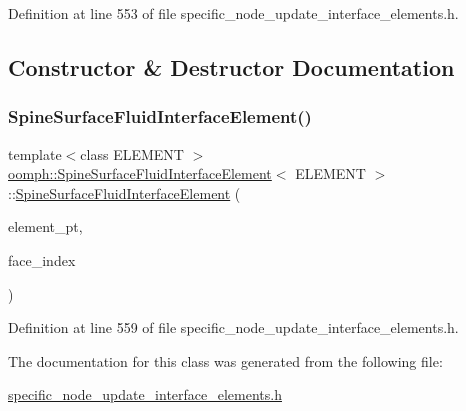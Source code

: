 Definition at line 553 of file specific\+\_\+node\+\_\+update\+\_\+interface\+\_\+elements.\+h.



\subsection{Constructor \& Destructor Documentation}
\mbox{\label{classoomph_1_1SpineSurfaceFluidInterfaceElement_aa1d52a09e4f50085b957463a0da22d4a}} 
\subsubsection{\texorpdfstring{Spine\+Surface\+Fluid\+Interface\+Element()}{SpineSurfaceFluidInterfaceElement()}}
{\footnotesize\ttfamily template$<$class E\+L\+E\+M\+E\+NT $>$ \\
\hyperlink{classoomph_1_1SpineSurfaceFluidInterfaceElement}{oomph\+::\+Spine\+Surface\+Fluid\+Interface\+Element}$<$ E\+L\+E\+M\+E\+NT $>$\+::\hyperlink{classoomph_1_1SpineSurfaceFluidInterfaceElement}{Spine\+Surface\+Fluid\+Interface\+Element} (\begin{DoxyParamCaption}\item[{Finite\+Element $\ast$const \&}]{element\+\_\+pt,  }\item[{const int \&}]{face\+\_\+index }\end{DoxyParamCaption})\hspace{0.3cm}{\ttfamily [inline]}}



Definition at line 559 of file specific\+\_\+node\+\_\+update\+\_\+interface\+\_\+elements.\+h.



The documentation for this class was generated from the following file\+:\begin{DoxyCompactItemize}
\item 
\hyperlink{specific__node__update__interface__elements_8h}{specific\+\_\+node\+\_\+update\+\_\+interface\+\_\+elements.\+h}\end{DoxyCompactItemize}
